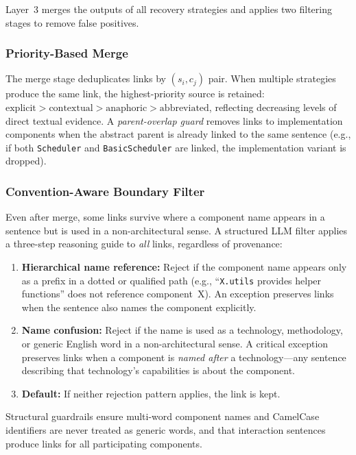 Layer~3 merges the outputs of all recovery strategies and applies
two filtering stages to remove false positives.

\subsubsection{Priority-Based Merge}\label{sec:dedup}

The merge stage deduplicates links by $(s_i, c_j)$ pair.
When multiple strategies produce the same link, the highest-priority
source is retained:
$\text{explicit} > \text{contextual} > \text{anaphoric} >
\text{abbreviated}$,
reflecting decreasing levels of direct textual evidence.
A \emph{parent-overlap guard} removes links to implementation
components when the abstract parent is already linked to the same
sentence (e.g., if both \texttt{Scheduler} and
\texttt{BasicScheduler} are linked, the implementation variant is
dropped).

\subsubsection{Convention-Aware Boundary Filter}\label{sec:boundary}

Even after merge, some links survive where a component name appears
in a sentence but is used in a non-architectural sense.
A structured LLM filter applies a three-step reasoning guide to
\emph{all} links, regardless of provenance:

\begin{enumerate}
    \item \textbf{Hierarchical name reference:}
      Reject if the component name appears only as a prefix in a
      dotted or qualified path (e.g., ``\texttt{X.utils} provides
      helper functions'' does not reference component~X).
      An exception preserves links when the sentence also names
      the component explicitly.
    \item \textbf{Name confusion:}
      Reject if the name is used as a technology, methodology, or
      generic English word in a non-architectural sense.
      A critical exception preserves links when a component is
      \emph{named after} a technology---any sentence describing that
      technology's capabilities is about the component.
    \item \textbf{Default:}
      If neither rejection pattern applies, the link is kept.
\end{enumerate}

\noindent Structural guardrails ensure multi-word component names and
CamelCase identifiers are never treated as generic words, and that
interaction sentences produce links for all participating components.

